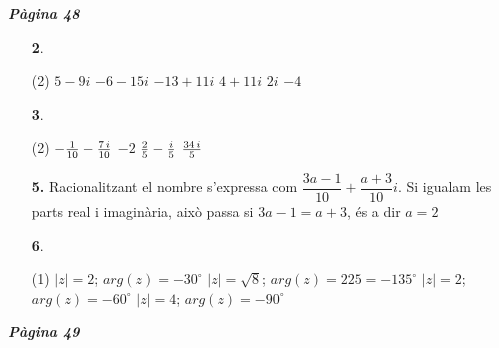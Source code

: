 \documentclass[a4paper, pdf, twoside]{book}
\begin{document}
\begin{multicols}{2}

{\textbf{\em Pàgina 48}} \hrulefill
\begin{enumerate}
\vspace{0.25cm}



 \item[\fontfamily{phv}\selectfont\color{blue}\textbf{2}. ]  \scalebox{0.6}{\simbolclau } 
 \begin{tasks}[column-sep=1em, item-indent=1.3333em](2)
	 \task  $5 -9i$
	 \task $-6-15i$
	 \task $-13+11i$
	 \task $4 + 11i$
	 \task $2i$
	 \task $-4$
\end{tasks}
 \end{enumerate}
\begin{enumerate}
\vspace{0.25cm}



 \item[\fontfamily{phv}\selectfont\color{blue}\textbf{3}. ]  \scalebox{0.6}{\simbolclau } 
 \begin{tasks}[column-sep=1em, item-indent=1.3333em](2)
	 \task  $-{{1}\over {10}}-{{7\,i}\over {10}}$
	 \task $-2$
	 \task ${{2}\over {5}}-{{i}\over {5}}$
	 \task ${{34\,i}\over {5}}$
\end{tasks}
\vspace{0.25cm}
\item[\fontfamily{phv}\selectfont\color{blue}\textbf{5. }] 
Racionalitzant el nombre s'expressa com $\dfrac {3a-1}{10}+\dfrac {a+3}{10}i$. Si igualam les parts real i imaginària, això passa si $3a-1=a+3$, és a dir $a=2$
\vspace{0.25cm}



 \item[\fontfamily{phv}\selectfont\color{blue}\textbf{6}. ]  \scalebox{0.6}{\simbolclau } 
 \begin{tasks}[column-sep=1em, item-indent=1.3333em](1)
	 \task  $|z|=2$; $arg(z)=-30^\circ $
	 \task* $|z|=\sqrt {8}$; $arg(z)=225 = - 135^\circ $
	 \task $|z|=2$; $arg(z)=-60^\circ $
	 \task $|z|=4$; $arg(z)=-90^\circ $
\end{tasks}
 \end{enumerate}
\vspace{0.3cm}


{\textbf{\em Pàgina 49}} \hrulefill
\begin{enumerate}
\vspace{0.25cm}



\end{enumerate}
\end{multicols}
\end{document}
